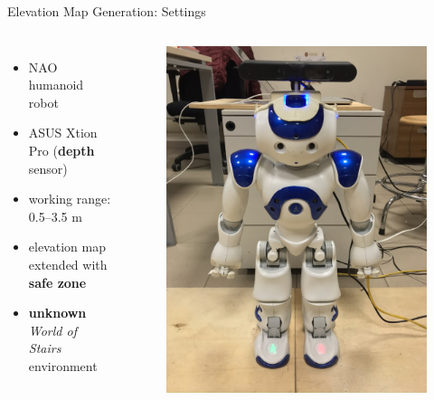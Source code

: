 \documentclass[10pt]{beamer}
\begin{document}
\begin{frame}{Elevation Map Generation: Settings}
	\begin{columns}[c,onlytextwidth]
			\begin{itemize}
				\item NAO humanoid robot
				\item ASUS Xtion Pro (\textbf{depth} sensor)
				\item working range: 0.5--3.5 m
				\item elevation map extended with \textbf{safe zone}
				\item \textbf{unknown} \textit{World of Stairs} environment
			\end{itemize}	
		  \begin{figure}
        \centering
        \includegraphics[width=\textwidth]{figures/NAO-with-xtion.JPEG}
    	\end{figure}		
	\end{columns}
\end{frame}
\end{document}

